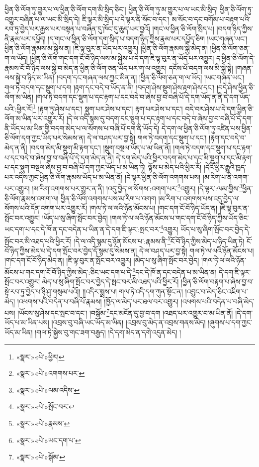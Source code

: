 ཕྱིན་ཅི་ལོག་ཏུ་གྱུར་པ་ལ་ཕྱིན་ཅི་ལོག་དག་མི་སྲིད་ཅིང་། ཕྱིན་ཅི་ལོག་ཏུ་མ་གྱུར་པ་ལ་ཡང་མི་སྲིད། ཕྱིན་ཅི་ལོག་ཏུ་འགྱུར་བཞིན་པ་ལ་ཡང་མི་སྲིད་དེ། ཇི་ལྟར་མི་སྲིད་པ་དེ་ལྟར་ནི་སོང་བ་དང་། མ་སོང་བ་དང་བགོམ་པ་བརྟག་པའི་རབ་ཏུ་བྱེད་པར་རྒྱས་པར་བསྟན་པ་བཞིན་དུ་ཁོང་དུ་ཆུད་པར་བྱའོ། །གང་ལ་ཕྱིན་ཅི་ལོག་སྲིད་པ། །བདག་ཉིད་ཀྱིས་ནི་རྣམ་པར་དཔྱོད། །ད་གང་ལ་ཕྱིན་ཅི་ལོག་དག་སྲིད་པ་བདག་ཉིད་ཀྱིས་རྣམ་པར་དཔྱོད་ཅིག །ཡང་གཞན་ཡང་། ཕྱིན་ཅི་ལོག་རྣམས་མ་སྐྱེས་ན། །ཇི་ལྟ་བུར་ན་ཡོད་པར་འགྱུར། །ཕྱིན་ཅི་ལོག་རྣམས་སྐྱེ་མེད་ན། །ཕྱིན་ཅི་ལོག་ཅན་ག་ལ་ཡོད། །ཕྱིན་ཅི་ལོག་གང་དག་ངོ་བོ་ཉིད་ལས་མ་སྐྱེས་པ་དེ་དག་ཇི་ལྟ་བུར་ན་ཡོད་པར་འགྱུར། ད་ཕྱིན་ཅི་ལོག་དེ་རྣམས་ངོ་བོ་ཉིད་ལས་སྐྱེ་བ་མེད་ན་ཕྱིན་ཅི་ལོག་ཅན་ཡོད་པར་ག་ལ་འགྱུར། དངོས་པོ་བདག་ལས་མི་སྐྱེ་སྟེ། །གཞན་ལས་སྐྱེ་བ་ཉིད་མ་ཡིན། །བདག་དང་གཞན་ལས་ཀྱང་མིན་ན། །ཕྱིན་ཅི་ལོག་ཅན་ག་ལ་ཡོད། །ཡང་གཞན་ཡང་། གལ་ཏེ་བདག་དང་སྡུག་པ་དག །རྟག་དང་བདེ་བ་ཡོད་ན་ནི། །བདག་ཤེས་སྡུག་ཤེས་རྟག་ཤེས་དང་། །བདེ་ཤེས་ཕྱིན་ཅི་ལོག་མ་ཡིན། །གལ་ཏེ་བདག་དང་སྡུག་པ་དང་རྟག་པ་དང་བདེ་བ་ཞེས་བྱ་བ་བཞི་པོ་དེ་དག་ཡོད་ན་ནི་དེ་དག་ཡོད་པའི་:ཕྱིར་རོ།\footnote{«སྣར་»«པེ་»ཕྱིར།} །རྟག་ཏུ་ཤེས་པ་དང་། སྡུག་པར་ཤེས་པ་དང་། རྟག་པར་ཤེས་པ་དང་། བདེ་བར་ཤེས་པ་དེ་དག་ཕྱིན་ཅི་ལོག་མ་ཡིན་པར་འགྱུར་རོ། །དེ་ལ་འདི་སྙམ་དུ་བདག་དང་སྡུག་པ་དང་རྟག་པ་དང་བདེ་བ་ཞེས་བྱ་བ་བཞི་པོ་དེ་དག་ནི་ཡོད་པ་མ་ཡིན་གྱི་བདག་མེད་པ་ལ་སོགས་པ་བཞི་པོ་དག་ནི་ཡོད་དེ། དེ་དག་ལ་ཕྱིན་ཅི་ལོག་ཏུ་འཛིན་པས་ཕྱིན་ཅི་ལོག་དག་ཀྱང་ཡོད་པར་སེམས་ན། དེ་ལ་བཤད་པར་བྱ་སྟེ། གལ་ཏེ་བདག་དང་སྡུག་པ་དང་། །རྟག་དང་བདེ་བ་མེད་ན་ནི། །བདག་མེད་མི་སྡུག་མི་རྟག་དང་། །སྡུག་བསྔལ་ཡོད་པ་མ་ཡིན་ནོ། །གལ་ཏེ་བདག་དང་སྡུག་པ་དང་རྟག་པ་དང་བདེ་བ་ཞེས་བྱ་བ་བཞི་པོ་དེ་དག་མེད་ན་ནི། དེ་དག་མེད་པའི་ཕྱིར་བདག་མེད་པ་དང་མི་སྡུག་པ་དང་མི་རྟག་པ་དང་སྡུག་བསྔལ་ཞེས་བྱ་བ་བཞི་པོ་དག་ཀྱང་ཡོད་པ་མ་ཡིན་ཏེ། ལྟོས་པ་མེད་པའི་ཕྱིར་རོ། །དེའི་ཕྱིར་རྒྱུའི་ཁྱད་པར་འདིས་ཀྱང་ཕྱིན་ཅི་ལོག་རྣམས་ཡོད་པ་མ་ཡིན་ནོ། །དེ་ལྟར་ཕྱིན་ཅི་ལོག་འགགས་པས། །མ་རིག་པ་ནི་འགག་པར་འགྱུར། །མ་རིག་འགགས་པར་གྱུར་ན་ནི། །འདུ་བྱེད་ལ་སོགས་:འགག་པར་\footnote{«སྣར་»«པེ་»འགགས་པར་}འགྱུར། །དེ་ལྟར་:ལམ་གྱིས་\footnote{«སྣར་»«པེ་»ལམ་འདིས་}ཕྱིན་ཅི་ལོག་རྣམས་འགག་ལ། ཕྱིན་ཅི་ལོག་འགགས་པས་མ་རིག་པ་འགག །མ་རིག་པ་འགགས་པས་འདུ་བྱེད་ལ་སོགས་པའི་དོན་འགག་པར་འགྱུར་རོ། །གལ་ཏེ་ལ་ལའི་ཉོན་མོངས་པ། །གང་དག་ངོ་བོ་ཉིད་ཡོད་ན། །ཇི་ལྟ་བུར་ན་སྤོང་བར་འགྱུར། །ཡོད་པ་སུ་ཞིག་སྤོང་བར་བྱེད། །གལ་ཏེ་ལ་ལའི་ཉོན་མོངས་པ་གང་དག་ངོ་བོ་ཉིད་ཀྱིས་ཡོད་ཅིང་ཡང་དག་པ་དང་དེ་ཁོ་ན་དང་བདེན་པ་ཡིན་ན་དེ་དག་ཇི་ལྟར་:སྤང་བར་\footnote{«སྣར་»«པེ་»སྤོང་བར་}འགྱུར། ཡོད་པ་སུ་ཞིག་སྤོང་བར་བྱེད་དེ་སྤོང་བར་མི་འཐད་པའི་ཕྱིར་རོ། །དེ་ལ་འདི་སྙམ་དུ་ཉོན་མོངས་པ་:རྣམས་ནི་\footnote{«སྣར་»«པེ་»རྣམས་}ངོ་བོ་ཉིད་ཀྱིས་མེད་པ་ཉིད་ཡིན་ཏེ། ངོ་བོ་ཉིད་ཀྱིས་མེད་པ་དེ་དག་སྤོང་བར་བྱེད་དོ་སྙམ་དུ་སེམས་ན། དེ་ལ་བཤད་པར་བྱ་སྟེ། གལ་ཏེ་ལ་ལའི་ཉོན་མོངས་པ། །གང་དག་ངོ་བོ་ཉིད་མེད་ན། །ཇི་ལྟ་བུར་ན་སྤོང་བར་འགྱུར། །མེད་པ་སུ་ཞིག་སྤོང་བར་བྱེད། །གལ་ཏེ་ལ་ལའི་ཉོན་མོངས་པ་གང་དག་ངོ་བོ་ཉིད་ཀྱིས་མེད་:ཅིང་ཡང་དག་པ་དེ་\footnote{«སྣར་»«པེ་»ཡང་དག་པ་}དང་དེ་ཁོ་ན་དང་བདེན་པ་མ་ཡིན་ན། དེ་དག་ཇི་ལྟར་སྤོང་བར་འགྱུར། མེད་པ་སུ་ཞིག་སྤོང་བར་བྱེད་དེ་སྤང་བར་མི་འཐད་པའི་ཕྱིར་རོ། །ཕྱིན་ཅི་ལོག་བརྟག་པ་ཞེས་བྱ་བ་སྟེ་རབ་ཏུ་བྱེད་པ་ཉི་ཤུ་གསུམ་པའོ།། །།འདིར་སྨྲས་པ། གལ་ཏེ་འདི་དག་ཀུན་སྟོང་ན། །འབྱུང་བ་མེད་ཅིང་འཇིག་པ་མེད། །འཕགས་པའི་བདེན་པ་བཞི་པོ་རྣམས། །ཁྱོད་ལ་མེད་པར་ཐལ་བར་འགྱུར། །འཕགས་པའི་བདེན་པ་བཞི་མེད་པས། །ཡོངས་སུ་ཤེས་དང་སྤང་བ་དང་། །བསྒོམ་\footnote{«སྣར་»«པེ་»སྒོམ་}དང་མངོན་དུ་བྱ་བ་དག །འཐད་པར་འགྱུར་བ་མ་ཡིན་ནོ། །དེ་དག་ཡོད་པ་མ་ཡིན་པས། །འབྲས་བུ་བཞི་ཡང་ཡོད་མ་ཡིན། །འབྲས་བུ་མེད་ན་འབྲས་གནས་མེད། །ཞུགས་པ་དག་ཀྱང་ཡོད་མ་ཡིན། །གལ་ཏེ་སྐྱེས་བུ་གང་ཟག་བརྒྱད། །དེ་དག་མེད་ན་དགེ་འདུན་མེད། །
